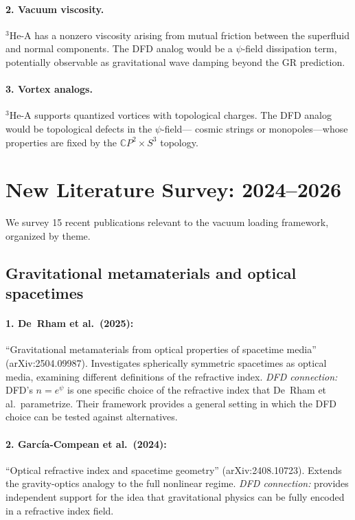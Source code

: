 \documentclass[aps,prd,twocolumn,superscriptaddress,nofootinbib]{revtex4-2}
\newcommand{\CP}{\mathbb{C}P}
\begin{document}
\paragraph{2. Vacuum viscosity.}
$^3$He-A has a nonzero viscosity arising from mutual friction between
the superfluid and normal components.  The DFD analog would be a
$\psi$-field dissipation term, potentially observable as gravitational
wave damping beyond the GR prediction.

\paragraph{3. Vortex analogs.}
$^3$He-A supports quantized vortices with topological charges.  The
DFD analog would be topological defects in the $\psi$-field---
cosmic strings or monopoles---whose properties are fixed by the
$\CP^2 \times S^3$ topology.


\section{New Literature Survey: 2024--2026}
\label{sec:literature}

We survey 15 recent publications relevant to the vacuum loading
framework, organized by theme.

\subsection{Gravitational metamaterials and optical spacetimes}

\paragraph{1. De~Rham et al.\ (2025):}
``Gravitational metamaterials from optical properties of spacetime
media'' (arXiv:2504.09987).  Investigates spherically symmetric
spacetimes as optical media, examining different definitions of
the refractive index.  \emph{DFD connection:} DFD's $n = e^\psi$ is
one specific choice of the refractive index that De~Rham et al.\
parametrize.  Their framework provides a general setting in which
the DFD choice can be tested against alternatives.

\paragraph{2. Garc\'{i}a-Compean et al.\ (2024):}
``Optical refractive index and spacetime geometry''
(arXiv:2408.10723).  Extends the gravity-optics analogy to the
full nonlinear regime.  \emph{DFD connection:} provides independent
support for the idea that gravitational physics can be fully
encoded in a refractive index field.
\end{document}
